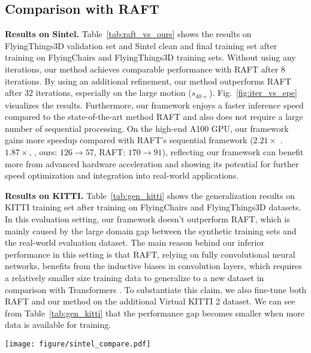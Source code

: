 \documentclass[10pt,twocolumn,letterpaper]{article}
\begin{document}
\subsection{Comparison with RAFT}
\label{sec:compare_raft}



{\bf Results on Sintel.} Table~\ref{tab:raft_vs_ours} shows the results on FlyingThings3D validation set and Sintel clean and final training set after training on FlyingChairs and FlyingThings3D training sets. Without using any iterations, our method achieves comparable performance with RAFT after 8 iterations. By using an additional refinement, our method outperforms RAFT after 32 iterations, especially on the large motion ($s_{40+}$). Fig.~\ref{fig:iter_vs_epe} visualizes the results. Furthermore, our framework enjoys a faster inference speed compared to the state-of-the-art method RAFT and also does not require a large number of sequential processing. On the high-end A100 GPU, our framework gains more speedup compared with RAFT's sequential framework ($2.21\times$ \vs. $1.87 \times$, \ie, ours: $126 \to 57$, RAFT: $170 \to 91$), reflecting our framework can benefit more from advanced hardware acceleration and showing its potential for further speed optimization and integration into real-world applications.







{\bf Results on KITTI.} Table~\ref{tab:gen_kitti} shows the generalization results on KITTI training set after training on FlyingChairs and FlyingThings3D datasets. In this evaluation setting, our framework doesn't outperform RAFT, which is mainly caused by the large domain gap between the synthetic training sets and the real-world evaluation dataset. The main reason behind our inferior performance in this setting is that RAFT, relying on fully convolutional neural networks, benefits from the inductive biases in convolution layers, which requires a relatively smaller size training data to generalize to a new dataset in comparison with Transformers \cite{dosovitskiy2020image, d2021convit,xu2021vitae}. To substantiate this claim, we also fine-tune both RAFT and our method on the additional Virtual KITTI 2 \cite{cabon2020virtual} dataset. We can see from Table~\ref{tab:gen_kitti} that the performance gap becomes smaller when more data is available for training.






\begin{figure*}[t]
    \centering
    \texttt{[image: figure/sintel\_compare.pdf]}
    \vspace{-12pt}
    \caption{Visual comparisons on Sintel test set.}
    \label{fig:sintel_test}
    \vspace{-12pt}
\end{figure*}
\end{document}

